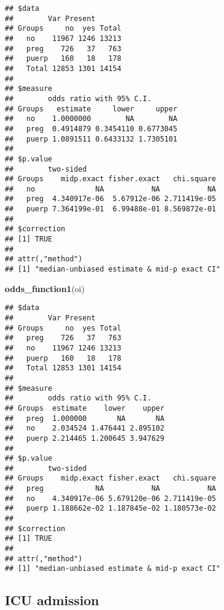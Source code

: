 \documentclass[
]{article}
\newenvironment{Shaded}{\begin{snugshade}}{\end{snugshade}}
\newcommand{\KeywordTok}[1]{\textcolor[rgb]{0.13,0.29,0.53}{\textbf{#1}}}
\newcommand{\NormalTok}[1]{#1}
\newcommand{\OperatorTok}[1]{\textcolor[rgb]{0.81,0.36,0.00}{\textbf{#1}}}
\newcommand{\StringTok}[1]{\textcolor[rgb]{0.31,0.60,0.02}{#1}}
\begin{document}
\begin{Shaded}
\end{Shaded}

\begin{verbatim}
## $data
##        Var Present
## Groups     no  yes Total
##   no    11967 1246 13213
##   preg    726   37   763
##   puerp   160   18   178
##   Total 12853 1301 14154
## 
## $measure
##        odds ratio with 95% C.I.
## Groups   estimate     lower     upper
##   no    1.0000000        NA        NA
##   preg  0.4914879 0.3454110 0.6773045
##   puerp 1.0891511 0.6433132 1.7305101
## 
## $p.value
##        two-sided
## Groups    midp.exact fisher.exact   chi.square
##   no              NA           NA           NA
##   preg  4.340917e-06  5.67912e-06 2.711419e-05
##   puerp 7.364199e-01  6.99488e-01 8.569872e-01
## 
## $correction
## [1] TRUE
## 
## attr(,"method")
## [1] "median-unbiased estimate & mid-p exact CI"
\end{verbatim}

\begin{Shaded}
\begin{Highlighting}[]
\KeywordTok{odds_function1}\NormalTok{(oi)}
\end{Highlighting}
\end{Shaded}

\begin{verbatim}
## $data
##        Var Present
## Groups     no  yes Total
##   preg    726   37   763
##   no    11967 1246 13213
##   puerp   160   18   178
##   Total 12853 1301 14154
## 
## $measure
##        odds ratio with 95% C.I.
## Groups  estimate    lower    upper
##   preg  1.000000       NA       NA
##   no    2.034524 1.476441 2.895102
##   puerp 2.214465 1.200645 3.947629
## 
## $p.value
##        two-sided
## Groups    midp.exact fisher.exact   chi.square
##   preg            NA           NA           NA
##   no    4.340917e-06 5.679120e-06 2.711419e-05
##   puerp 1.188662e-02 1.187845e-02 1.180573e-02
## 
## $correction
## [1] TRUE
## 
## attr(,"method")
## [1] "median-unbiased estimate & mid-p exact CI"
\end{verbatim}

\hypertarget{icu-admission}{%
\subsection{ICU admission}\label{icu-admission}}
\end{document}
